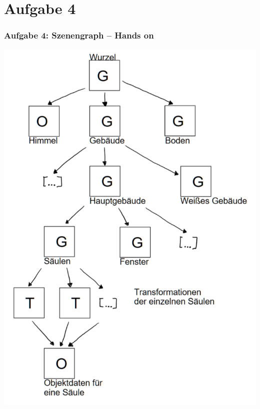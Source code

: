 \documentclass[accentcolor=tud9c,colorbacktitle,inverttitle,landscape,german,presentation,t]{tudbeamer}
\begin{document}
\section{Aufgabe 4}
\begin{frame}
	\frametitle{Aufgabe 4: Szenengraph – Hands on}
	\centering
	\includegraphics[height=1\textheight]{aufg4.png}
\end{frame}
\end{document}
